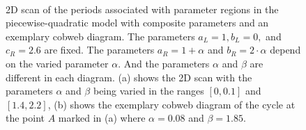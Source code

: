 \begin{figure}
	\centering
	 \\
	\caption[2D scan of the periods associated with parameter regions in the piecewise-quadratic model with composite parameters and an exemplary cobweb diagram]{
		2D scan of the periods associated with parameter regions in the piecewise-quadratic model with composite parameters and an exemplary cobweb diagram.
		The parameters $a_L = 1, b_L = 0,$ and $c_R = 2.6$ are fixed.
		The parameters $a_R = 1 + \alpha$ and $b_R = 2 \cdot \alpha$ depend on the varied parameter $\alpha$.
		And the parameters $\alpha$ and $\beta$ are different in each diagram.
		(a) shows the 2D scan with the parameters $\alpha$ and $\beta$ being varied in the ranges $[0, 0.1]$ and $[1.4, 2.2]$,
		(b) shows the exemplary cobweb diagram of the cycle at the point $A$ marked in (a) where $\alpha = 0.08$ and $\beta = 1.85$.
	}
\end{figure}


